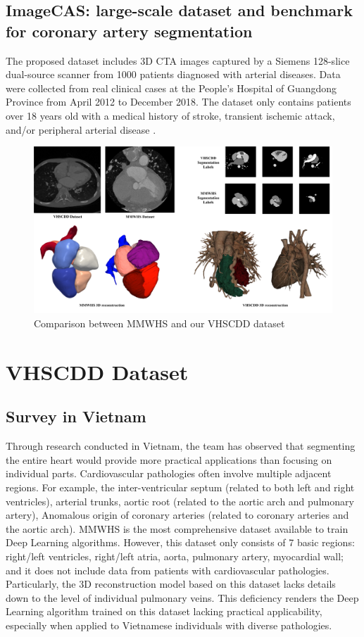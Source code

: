 \documentclass{article}
\begin{document}
\subsection{ImageCAS: large-scale dataset and benchmark for coronary artery segmentation}
The proposed dataset includes 3D CTA images captured by a Siemens 128-slice dual-source scanner from 1000 patients diagnosed with arterial diseases. Data were collected from real clinical cases at the People's Hospital of Guangdong Province from April 2012 to December 2018. The dataset only contains patients over 18 years old with a medical history of stroke, transient ischemic attack, and/or peripheral arterial disease \cite{imagecas}.

\begin{figure}
    \centering
    \includegraphics[width=1\textwidth]{figures/comparison.png}
    \caption{Comparison between MMWHS and our VHSCDD dataset}
    \label{fig:enter-label}
\end{figure}

\section{VHSCDD Dataset}

\subsection{Survey in Vietnam}
Through research conducted in Vietnam, the team has observed that segmenting the entire heart would provide more practical applications than focusing on individual parts. Cardiovascular pathologies often involve multiple adjacent regions. For example, the inter-ventricular septum (related to both left and right ventricles), arterial trunks, aortic root (related to the aortic arch and pulmonary artery), Anomalous origin of coronary arteries (related to coronary arteries and the aortic arch). MMWHS is the most comprehensive dataset available to train Deep Learning algorithms. However, this dataset only consists of 7 basic regions: right/left ventricles, right/left atria, aorta, pulmonary artery, myocardial wall; and it does not include data from patients with cardiovascular pathologies. Particularly, the 3D reconstruction model based on this dataset lacks details down to the level of individual pulmonary veins. This deficiency renders the Deep Learning algorithm trained on this dataset lacking practical applicability, especially when applied to Vietnamese individuals with diverse pathologies.
\end{document}
